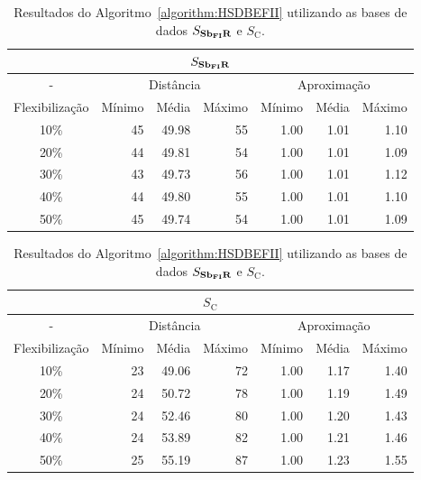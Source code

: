 \begin{table}[!htb]
  \caption{Resultados do Algoritmo~\ref{algorithm:HSDBEFII} utilizando as bases de dados $S_{\textbf{Sb\textsubscript{FI}R}}{}$ e $S_{\text{C}}$.}
  \label{table:MGYFELVA}
  \centering
  \begin{tabular}{|c|r|r|r|r|r|r|}
    \hline
    \multicolumn{7}{|c|}{$S_{\textbf{Sb\textsubscript{FI}R}}{}$}                                                                       \\ \hline
      -            & \multicolumn{3}{c|}{Distância}             & \multicolumn{3}{c|}{Aproximação}           \\ \hline
    Flexibilização & Mínimo       & Média        & Máximo       & Mínimo       & Média        & Máximo       \\ \hline  
    10\%           & 45           & 49.98        & 55           & 1.00         & 1.01         & 1.10         \\ \hline
    20\%           & 44           & 49.81        & 54           & 1.00         & 1.01         & 1.09         \\ \hline
    30\%           & 43           & 49.73        & 56           & 1.00         & 1.01         & 1.12         \\ \hline
    40\%           & 44           & 49.80        & 55           & 1.00         & 1.01         & 1.10         \\ \hline
    50\%           & 45           & 49.74        & 54           & 1.00         & 1.01         & 1.09         \\ \hline    
  \end{tabular}

  \vspace{5mm}

  \begin{tabular}{|c|r|r|r|r|r|r|}
    \hline
    \multicolumn{7}{|c|}{$S_{\text{C}}$}                                                                     \\ \hline
      -            & \multicolumn{3}{c|}{Distância}             & \multicolumn{3}{c|}{Aproximação}           \\ \hline
    Flexibilização & Mínimo       & Média        & Máximo       & Mínimo       & Média        & Máximo       \\ \hline  
    10\%           & 23           & 49.06        & 72           & 1.00         & 1.17         & 1.40         \\ \hline
    20\%           & 24           & 50.72        & 78           & 1.00         & 1.19         & 1.49         \\ \hline
    30\%           & 24           & 52.46        & 80           & 1.00         & 1.20         & 1.43         \\ \hline
    40\%           & 24           & 53.89        & 82           & 1.00         & 1.21         & 1.46         \\ \hline
    50\%           & 25           & 55.19        & 87           & 1.00         & 1.23         & 1.55         \\ \hline    
  \end{tabular}
\end{table}

